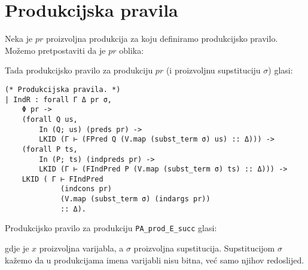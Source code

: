 \section{Produkcijska pravila}
Neka je \(pr\) proizvoljna produkcija za koju definiramo produkcijsko pravilo.
Možemo pretpostaviti da je \(pr\) oblika:
\begin{prooftree}
\end{prooftree}
\noindent Tada produkcijsko pravilo za produkciju \(pr\) (i proizvoljnu supstituciju \(\sigma\)) glasi:
\begin{prooftree}
\end{prooftree}
\begin{verbatim}
(* Produkcijska pravila. *)
| IndR : forall Γ Δ pr σ,
    Φ pr ->
    (forall Q us,
        In (Q; us) (preds pr) ->
        LKID (Γ ⊢ (FPred Q (V.map (subst_term σ) us) :: Δ))) ->
    (forall P ts,
        In (P; ts) (indpreds pr) ->
        LKID (Γ ⊢ (FIndPred P (V.map (subst_term σ) ts) :: Δ))) ->
    LKID ( Γ ⊢ FIndPred
             (indcons pr)
             (V.map (subst_term σ) (indargs pr))
             :: Δ).
\end{verbatim}

\begin{example}
  Produkcijsko pravilo za produkciju \texttt{PA\_prod\_E\_succ} glasi:
  \begin{prooftree}
  \end{prooftree}
  \noindent gdje je \(x\) proizvoljna varijabla, a \(\sigma\) proizvoljna supstitucija.
  Supstitucijom \(\sigma\) kažemo da u produkcijama imena varijabli nisu bitna,
  već samo njihov redoslijed.
\end{example}

